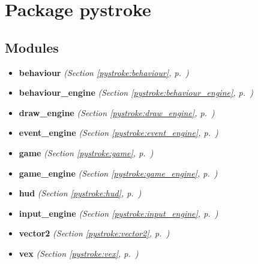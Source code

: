 %
%
%


\section{Package pystroke}

    \label{pystroke}


\subsection{Modules}

\begin{itemize}
\setlength{\parskip}{0ex}
\item \textbf{behaviour}
  \textit{(Section \ref{pystroke:behaviour}, p.~\pageref{pystroke:behaviour})}

\item \textbf{behaviour\_engine}
  \textit{(Section \ref{pystroke:behaviour_engine}, p.~\pageref{pystroke:behaviour_engine})}

\item \textbf{draw\_engine}
  \textit{(Section \ref{pystroke:draw_engine}, p.~\pageref{pystroke:draw_engine})}

\item \textbf{event\_engine}
  \textit{(Section \ref{pystroke:event_engine}, p.~\pageref{pystroke:event_engine})}

\item \textbf{game}
  \textit{(Section \ref{pystroke:game}, p.~\pageref{pystroke:game})}

\item \textbf{game\_engine}
  \textit{(Section \ref{pystroke:game_engine}, p.~\pageref{pystroke:game_engine})}

\item \textbf{hud}
  \textit{(Section \ref{pystroke:hud}, p.~\pageref{pystroke:hud})}

\item \textbf{input\_engine}
  \textit{(Section \ref{pystroke:input_engine}, p.~\pageref{pystroke:input_engine})}

\item \textbf{vector2}
  \textit{(Section \ref{pystroke:vector2}, p.~\pageref{pystroke:vector2})}

\item \textbf{vex}
  \textit{(Section \ref{pystroke:vex}, p.~\pageref{pystroke:vex})}

\end{itemize}


